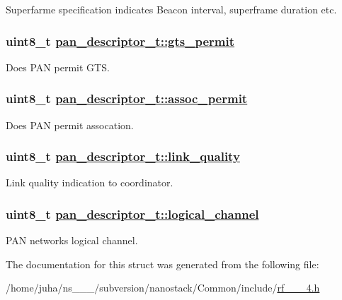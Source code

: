 Superfarme specification indicates Beacon interval, superframe duration etc. \hypertarget{structpan__descriptor__t_0947e8dac75a8b36c19aa1c7d1af6e0f}{
\subsubsection[gts\_\-permit]{\setlength{\rightskip}{0pt plus 5cm}uint8\_\-t \hyperlink{structpan__descriptor__t_0947e8dac75a8b36c19aa1c7d1af6e0f}{pan\_\-descriptor\_\-t::gts\_\-permit}}}
\label{structpan__descriptor__t_0947e8dac75a8b36c19aa1c7d1af6e0f}


Does PAN permit GTS. \hypertarget{structpan__descriptor__t_eaeabc250f8e65872e96b2b0d7b12061}{
\subsubsection[assoc\_\-permit]{\setlength{\rightskip}{0pt plus 5cm}uint8\_\-t \hyperlink{structpan__descriptor__t_eaeabc250f8e65872e96b2b0d7b12061}{pan\_\-descriptor\_\-t::assoc\_\-permit}}}
\label{structpan__descriptor__t_eaeabc250f8e65872e96b2b0d7b12061}


Does PAN permit assocation. \hypertarget{structpan__descriptor__t_07f083a4298ec06fd86e920ef3eb4a47}{
\subsubsection[link\_\-quality]{\setlength{\rightskip}{0pt plus 5cm}uint8\_\-t \hyperlink{structpan__descriptor__t_07f083a4298ec06fd86e920ef3eb4a47}{pan\_\-descriptor\_\-t::link\_\-quality}}}
\label{structpan__descriptor__t_07f083a4298ec06fd86e920ef3eb4a47}


Link quality indication to coordinator. \hypertarget{structpan__descriptor__t_17a106035a332e15842bf81b5038a813}{
\subsubsection[logical\_\-channel]{\setlength{\rightskip}{0pt plus 5cm}uint8\_\-t \hyperlink{structpan__descriptor__t_17a106035a332e15842bf81b5038a813}{pan\_\-descriptor\_\-t::logical\_\-channel}}}
\label{structpan__descriptor__t_17a106035a332e15842bf81b5038a813}


PAN networks logical channel. 

The documentation for this struct was generated from the following file:\begin{CompactItemize}
\item 
/home/juha/ns\_\_\_/subversion/nanostack/Common/include/\hyperlink{rf__802__15__4_8h}{rf\_\_\_\-4.h}\end{CompactItemize}
